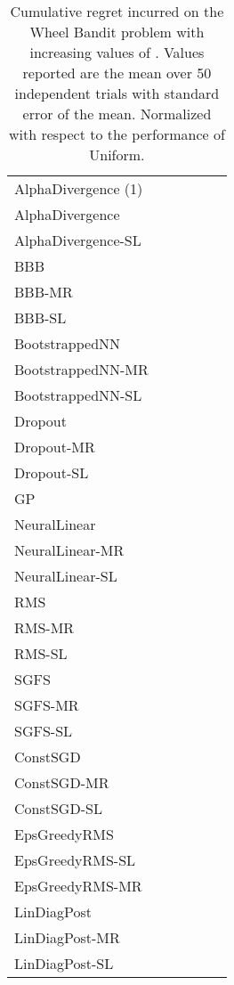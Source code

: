 \documentclass{article} \usepackage{iclr2018_conference,times}
\begin{document}
\begin{landscape}
\begin{table}[ht]
  \caption{Cumulative regret incurred on the Wheel Bandit problem with increasing values of . Values reported are the mean over 50 independent trials with standard error of the mean. Normalized with respect to the performance of Uniform.}
  \label{tb:wheel-cumregret}
  \centering
  \footnotesize
  \tiny
\begin{tabular}{llllll}
 &  &  &  &  &  \\
\midrule
AlphaDivergence (1) & & & & &  \\
AlphaDivergence & & & & &  \\
AlphaDivergence-SL & & & & &  \\
BBB & & & & &  \\
BBB-MR & & & & &  \\
BBB-SL & & & & &  \\
BootstrappedNN & & & & &  \\
BootstrappedNN-MR & & & & &  \\
BootstrappedNN-SL & & & & &  \\
Dropout & & & & &  \\
Dropout-MR & & & & &  \\
Dropout-SL & & & & &  \\
GP & & & & &  \\
NeuralLinear & & & \bm{}& &  \\
NeuralLinear-MR & \bm{}& \bm{}& & \bm{}&  \\
NeuralLinear-SL & & & & &  \\
RMS & & & & &  \\
RMS-MR & & & & &  \\
RMS-SL & & & & &  \\
SGFS & & & & &  \\
SGFS-MR & & & & &  \\
SGFS-SL & & & & &  \\
ConstSGD & & & & &  \\
ConstSGD-MR & & & & &  \\
ConstSGD-SL & & & & &  \\
EpsGreedyRMS & & & & &  \\
EpsGreedyRMS-SL & & & & &  \\
EpsGreedyRMS-MR & & & & &  \\
LinDiagPost & & & & \bm{}& \bm{} \\
LinDiagPost-MR & & & & &  \\
LinDiagPost-SL & & & & &  \\

\end{tabular}
\end{table}
\end{landscape}
\end{document}
